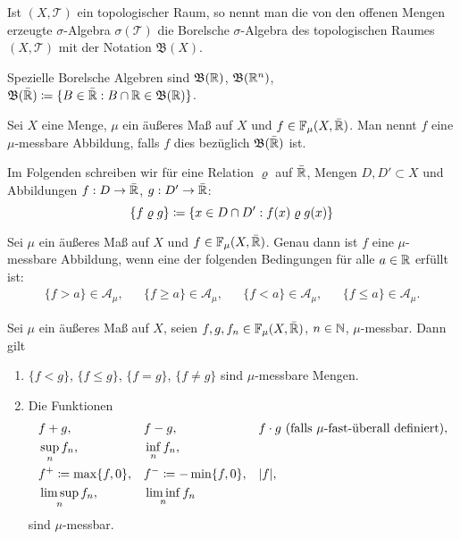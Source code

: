\documentclass[a4paper,twoside,DIV15,BCOR12mm]{scrbook}
\newcommand{\A}{\mathcal A}
\newcommand{\borel}{\mathfrak B}
\begin{document}
\begin{definition}
Ist $(X,\mathcal T)$ ein topologischer Raum, so nennt man die von den offenen Mengen erzeugte $\sigma$-Algebra $\sigma(\mathcal T)$ die Borelsche $\sigma$-Algebra des topologischen Raumes $(X,\mathcal T)$ mit der Notation $\borel(X)$.

Spezielle Borelsche Algebren sind $\borel(\MdR)$, $\borel(\MdR^n)$, $\borel(\bar\MdR) \da \{B\in \bar\MdR : B\cap \MdR \in \borel(\MdR)\}$.
\end{definition}

\begin{definition}
Sei $X$ eine Menge, $\mu$ ein äußeres Maß auf $X$ und $f\in\mathbb F_\mu(X,\bar{\mathbb{R}})$. Man nennt $f$ eine $\mu$-messbare Abbildung, falls $f$ dies bezüglich $\borel(\bar\MdR)$ ist.
\end{definition}

Im Folgenden schreiben wir für eine Relation $\varrho$ auf $\bar{\mathbb{R}}$, Mengen $D, D'\subset X$ und Abbildungen $f: D\to \bar{\mathbb{R}}$, $g:D'\to\bar{\mathbb{R}}$:
\[
\{ f\mathrel{\varrho} g\} \da \{ x\in D\cap D' : f(x)\mathrel{\varrho} g(x) \}
\]

\begin{lemma}
Sei $\mu$ ein äußeres Maß auf $X$ und $f\in \mathbb F_\mu(X,\bar{\mathbb{R}})$. Genau dann ist $f$ eine $\mu$-messbare Abbildung, wenn eine der folgenden Bedingungen für alle $a\in\mathbb{R}$ erfüllt ist:
\begin{align*}
 \{f > a\} \in \A_\mu, && \{f\ge a\} \in \A_\mu, && \{f<a\} \in \A_\mu, && \{f\le a\}\in\A_\mu.
\end{align*}
\end{lemma}

\begin{lemma}
Sei $\mu$ ein äußeres Maß auf $X$, seien $f,g,f_n\in \mathbb F_\mu(X,\bar{\mathbb{R}})$, $n\in\mathbb{N}$, $\mu$-messbar. Dann gilt
\begin{enumerate}[\quad(a)]
\item $\{f<g\}$, $\{f\le g\}$, $\{f=g\}$, $\{f\ne g\}$ sind $\mu$-messbare Mengen.
\item Die Funktionen
\begin{align*}
&f+ g, && f-g, && f \cdot g \text{ (falls $\mu$-fast-überall definiert)}, \\
&\sup_n f_n, && \inf_n f_n, && \\
&f^+ \da \max\{f,0\}, && f^- \da -\min\{f,0\}, && |f|, \\
&\limsup_n f_n, && \liminf_n f_n
\end{align*}
sind $\mu$-messbar.
\end{enumerate}
\end{lemma}
\end{document}
